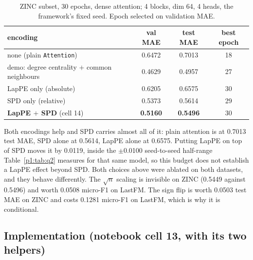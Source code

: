 \begin{table}[H]
\centering
\caption{ZINC subset, 30 epochs, dense attention; 4 blocks, dim 64, 4 heads, the framework's fixed seed. Epoch selected on validation MAE.}
\label{p1:tab:q1}
\begin{tabular}{lccc}
\toprule
encoding & val MAE & test MAE & best epoch \\
\midrule
none (plain \texttt{Attention}) & 0.6472 & 0.7013 & 18 \\
demo: degree centrality $+$ common neighbours & 0.4629 & 0.4957 & 27 \\
LapPE only (absolute) & 0.6205 & 0.6575 & 30 \\
SPD only (relative) & 0.5373 & 0.5614 & 29 \\
\textbf{LapPE $+$ SPD} (cell 14) & \textbf{0.5160} & \textbf{0.5496} & 30 \\
\bottomrule
\end{tabular}
\end{table}

Both encodings help and SPD carries almost all of it: plain attention is at 0.7013 test MAE, SPD alone at 0.5614, LapPE alone at 0.6575. Putting LapPE on top of SPD moves it by 0.0119, inside the $\pm$0.0100 seed-to-seed half-range Table~\ref{p1:tab:q2} measures for that same model, so this budget does not establish a LapPE effect beyond SPD. Both choices above were ablated on both datasets, and they behave differently. The $\sqrt{n}$ scaling is invisible on ZINC (0.5449 against 0.5496) and worth 0.0508 micro-F1 on LastFM. The sign flip is worth 0.0503 test MAE on ZINC and costs 0.1281 micro-F1 on LastFM, which is why it is conditional.

\subsection*{Implementation (notebook cell 13, with its two helpers)}

